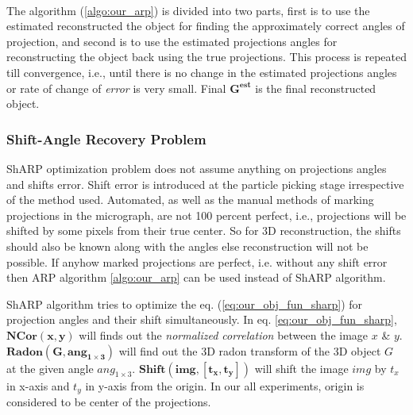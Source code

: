\documentclass[twoside]{iitbreport}
\begin{document}
\hspace{1cm}\\
The algorithm (\ref{algo:our_arp}) is divided into two parts, first is to use the estimated reconstructed the object for finding the approximately correct angles of projection, and second is to use the estimated projections angles for reconstructing the object back using the true projections. This process is repeated till convergence, i.e., until there is no change in the estimated projections angles or rate of change of \textit{error} is very small. Final ${\boldsymbol{G^{est}}}$ is the final reconstructed object. 


\subsubsection{\textbf{Shift-Angle Recovery Problem}}

ShARP optimization problem does not assume anything on projections angles and shifts error. Shift error is introduced at the particle picking stage irrespective of the method used. Automated, as well as the manual methods of marking projections in the micrograph,  are not 100 percent perfect, i.e., projections will be shifted by some pixels from their true center. So for 3D reconstruction, the shifts should also be known along with the angles else reconstruction will not be possible. If anyhow marked projections are perfect, i.e. without any shift error then ARP algorithm \ref{algo:our_arp} can be used instead of ShARP algorithm.  

ShARP algorithm tries to optimize the eq. (\ref{eq:our_obj_fun_sharp}) for projection angles and their shift simultaneously.  In eq. \ref{eq:our_obj_fun_sharp}, ${\boldsymbol{NCor(x,y)}}$ will finds out the \textit{normalized correlation} between the image ${x}$ \& ${y}$. ${\boldsymbol{Radon(G,ang_{1\times 3})}}$ will find out the 3D radon transform of the 3D object ${G}$ at the given angle ${ang_{1 \times 3}}$. ${\boldsymbol{Shift(img,[t_x,t_y])}}$ will shift the image ${img}$ by ${t_x}$ in x-axis and ${t_y}$ in y-axis from the origin. In our all experiments, origin is considered to be center of the projections.   
\end{document}
